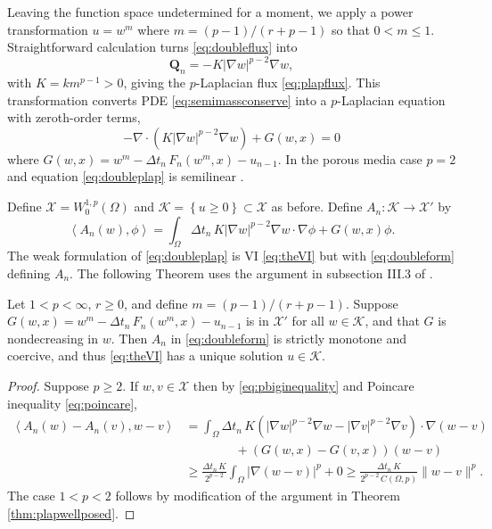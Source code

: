 \documentclass[final,onefignum]{siamart190516}
\newcommand\bQ{\mathbf{Q}}
\newcommand{\Div}{\nabla\cdot}
\newcommand{\grad}{\nabla}
\newcommand{\ip}[2]{\ensuremath{\left<#1,#2\right>}}
\begin{document}
Leaving the function space undetermined for a moment, we apply a power transformation $u = w^m$ where $m = (p-1)/(r+p-1)$ \cite{Raviart1970} so that $0 < m \le 1$.  Straightforward calculation turns \eqref{eq:doubleflux} into
\begin{equation}
	\bQ_n = - K |\grad w|^{p-2} \grad w, \label{eq:doublenewflux}
\end{equation}
with $K=k m^{p-1}>0$, giving the $p$-Laplacian flux \eqref{eq:plapflux}.  This transformation converts PDE \eqref{eq:semimassconserve} into a $p$-Laplacian equation with zeroth-order terms,
\begin{equation}
    - \Div\left(K|\grad w|^{p-2} \grad w\right) + G(w,x) = 0  \label{eq:doubleplap}
\end{equation}
where $G(w,x) = w^m - \Delta t_n\, F_n(w^m,x) - u_{n-1}$.  In the porous media case $p=2$ and equation \eqref{eq:doubleplap} is semilinear \cite{Evans2010}.

Define $\mathcal{X} = W_0^{1,p}(\Omega)$ and $\mathcal{K} =\left\{u\ge 0\right\} \subset \mathcal{X}$ as before.  Define $A_n: \mathcal{K} \to \mathcal{X}'$ by
\begin{equation}
\ip{A_n(w)}{\phi} = \int_\Omega \Delta t_n\, K |\grad w|^{p-2} \grad w\cdot \grad \phi + G(w,x)\phi. \label{eq:doubleform}
\end{equation}
The weak formulation of \eqref{eq:doubleplap} is VI \eqref{eq:theVI} but with \eqref{eq:doubleform} defining $A_n$.  The following Theorem uses the argument in subsection III.3 of \cite{KinderlehrerStampacchia1980}.

\begin{theorem}
Let $1<p<\infty$, $r\ge 0$, and define $m = (p-1)/(r+p-1)$.  Suppose $G(w,x)=w^m - \Delta t_n\, F_n(w^m,x) - u_{n-1}$ is in $\mathcal{X}'$ for all $w\in\mathcal{K}$, and that $G$ is nondecreasing in $w$.  Then $A_n$ in \eqref{eq:doubleform} is strictly monotone and coercive, and thus \eqref{eq:theVI} has a unique solution $u\in\mathcal{K}$.
\end{theorem}

\begin{proof}
Suppose $p\ge 2$.  If $w,v\in\mathcal{X}$ then by \eqref{eq:pbiginequality} and Poincare inequality \eqref{eq:poincare},
\begin{align*}
\ip{A_n(w)-A_n(v)}{w-v} &= \int_\Omega \Delta t_n\, K \left(|\grad w|^{p-2} \grad w - |\grad v|^{p-2} \grad v\right) \cdot \grad (w-v) \\
  &\qquad\qquad + \left(G(w,x) - G(v,x)\right) (w-v) \\
  &\ge \frac{\Delta t_n\,K}{2^{p-2}} \int_\Omega |\grad (w-v)|^p + 0 \ge \frac{\Delta t_n\,K}{2^{p-2}\, C(\Omega,p)} \|w-v\|^p.
\end{align*}
The case $1<p<2$ follows by modification of the argument in Theorem \ref{thm:plapwellposed}.
\end{proof}
\end{document}
